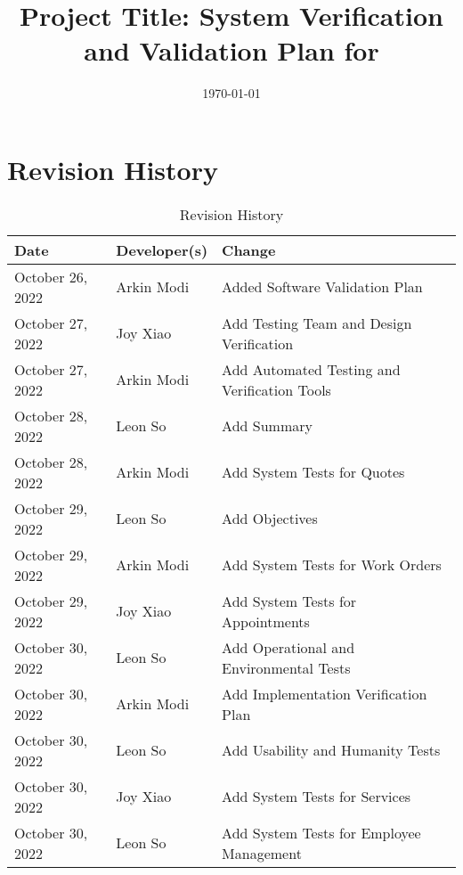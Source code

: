 \documentclass[12pt, titlepage]{article}
\begin{document}
\title{Project Title: System Verification and Validation Plan for \progname{}}
\author{\authname}
\date{\today}

\maketitle


\section{Revision History}

\begin{table}[hp]
	\caption{Revision History} \label{TblRevisionHistory}
	\begin{tabularx}{\textwidth}{llX}
		\toprule
		\textbf{Date}    & \textbf{Developer(s)} & \textbf{Change}                              \\
		\midrule
		October 26, 2022 & Arkin Modi            & Added Software Validation Plan               \\
		October 27, 2022 & Joy Xiao              & Add Testing Team and Design Verification     \\
		October 27, 2022 & Arkin Modi            & Add Automated Testing and Verification Tools \\
		October 28, 2022 & Leon So               & Add Summary                                  \\
		October 28, 2022 & Arkin Modi            & Add System Tests for Quotes                  \\
		October 29, 2022 & Leon So               & Add Objectives                               \\
		October 29, 2022 & Arkin Modi            & Add System Tests for Work Orders             \\
		October 29, 2022 & Joy Xiao              & Add System Tests for Appointments            \\
		October 30, 2022 & Leon So               & Add Operational and Environmental Tests      \\
		October 30, 2022 & Arkin Modi            & Add Implementation Verification Plan         \\
		October 30, 2022 & Leon So               & Add Usability and Humanity Tests             \\
		October 30, 2022 & Joy Xiao              & Add System Tests for Services                \\
		October 30, 2022 & Leon So               & Add System Tests for Employee Management     \\
		\bottomrule
	\end{tabularx}
\end{table}
\end{document}
